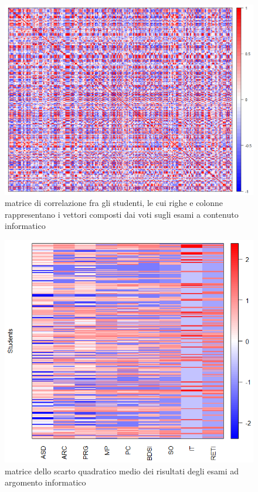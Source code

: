                 \begin{figure}
                    \centering
                    \caption{matrice di correlazione fra gli studenti, le cui righe e colonne rappresentano i vettori composti dai voti sugli esami a contenuto informatico}
                    \label{esami_inf_corr}
                	\includegraphics[scale=0.32]{img/corr_matrix_2.png}
                \end{figure}

                \begin{figure}
                    \centering
                    \caption{matrice dello scarto quadratico medio dei risultati degli esami ad argomento informatico}
                    \label{esami_inf_stddev}
                	\includegraphics[scale=0.6]{img/std_dev_matrix_2.png}
                \end{figure}

